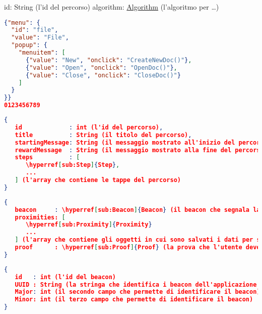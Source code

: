 {
   id: String (l'id del percorso)
   algorithm: \hyperref[sub:Algorithm]{Algorithm} (l'algoritmo per …)
}


\begin{lstlisting}[language=json,firstnumber=1]
{"menu": {
  "id": "file",
  "value": "File",
  "popup": {
    "menuitem": [
      {"value": "New", "onclick": "CreateNewDoc()"},
      {"value": "Open", "onclick": "OpenDoc()"},
      {"value": "Close", "onclick": "CloseDoc()"}
    ]
  }
}}
0123456789
\end{lstlisting}

\begin{lstlisting}[language=json,firstnumber=1]
{
   id             : int (l'id del percorso),
   title          : String (il titolo del percorso),
   startingMessage: String (il messaggio mostrato all'inizio del percorso),
   rewardMessage  : String (il messaggio mostrato alla fine del percorso),
   steps          : [
      \hyperref[sub:Step]{Step},
      ...
   ] (l'array che contiene le tappe del percorso)
}
\end{lstlisting}

\begin{lstlisting}[language=json,firstnumber=1]
{
   beacon     : \hyperref[sub:Beacon]{Beacon} (il beacon che segnala la posizione della tappa)
   proximities: [
      \hyperref[sub:Proximity]{Proximity}
      ...
   ] (l'array che contiene gli oggetti in cui sono salvati i dati per segnalare all'utente la distanza che manca per raggiungere questa stazione)
   proof      : \hyperref[sub:Proof]{Proof} (la prova che l'utente deve affrontare quando raggiunge la stazione)
}
\end{lstlisting}

\begin{lstlisting}[language=json,firstnumber=1]
{
   id   : int (l'id del beacon)
   UUID : String (la stringa che identifica i beacon dell'applicazione o i beacon dell'edificio, è il primo campo che permette di identificare il beacon)
   Major: int (il secondo campo che permette di identificare il beacon)
   Minor: int (il terzo campo che permette di identificare il beacon)
}
\end{lstlisting}
